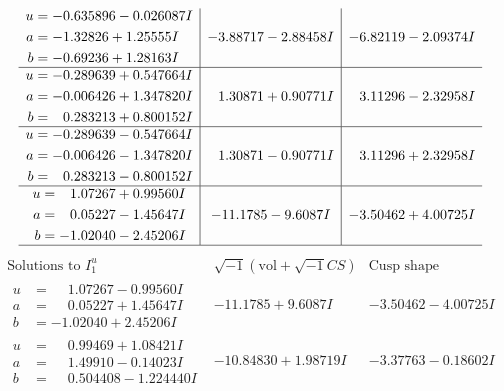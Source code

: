 \documentclass[1p]{elsarticle_modified}
\theoremstyle{definition}
\newcommand{\I}{\sqrt{-1}}
\begin{document}
$$\begin{array}{c|c|c}
\begin{aligned}
u &= -0.635896 - 0.026087 I \\
a &= -1.32826 + 1.25555 I \\
b &= -0.69236 + 1.28163 I\end{aligned}
 & -3.88717 - 2.88458 I & -6.82119 - 2.09374 I \\ \hline\begin{aligned}
u &= -0.289639 + 0.547664 I \\
a &= -0.006426 + 1.347820 I \\
b &= \phantom{-}0.283213 + 0.800152 I\end{aligned}
 & \phantom{-}1.30871 + 0.90771 I & \phantom{-}3.11296 - 2.32958 I \\ \hline\begin{aligned}
u &= -0.289639 - 0.547664 I \\
a &= -0.006426 - 1.347820 I \\
b &= \phantom{-}0.283213 - 0.800152 I\end{aligned}
 & \phantom{-}1.30871 - 0.90771 I & \phantom{-}3.11296 + 2.32958 I \\ \hline\begin{aligned}
u &= \phantom{-}1.07267 + 0.99560 I \\
a &= \phantom{-}0.05227 - 1.45647 I \\
b &= -1.02040 - 2.45206 I\end{aligned}
 & -11.1785 - 9.6087 I & -3.50462 + 4.00725 I\\
 \hline 
 \end{array}$$\newpage$$\begin{array}{c|c|c}  
\text{Solutions to }I^u_{1}& \I (\text{vol} + \sqrt{-1}CS) & \text{Cusp shape}\\
 \hline 
\begin{aligned}
u &= \phantom{-}1.07267 - 0.99560 I \\
a &= \phantom{-}0.05227 + 1.45647 I \\
b &= -1.02040 + 2.45206 I\end{aligned}
 & -11.1785 + 9.6087 I & -3.50462 - 4.00725 I \\ \hline\begin{aligned}
u &= \phantom{-}0.99469 + 1.08421 I \\
a &= \phantom{-}1.49910 - 0.14023 I \\
b &= \phantom{-}0.504408 - 1.224440 I\end{aligned}
 & -10.84830 + 1.98719 I & -3.37763 - 0.18602 I \\ \hline\begin{aligned}

\end{aligned}
\end{array}$$
\end{document}
